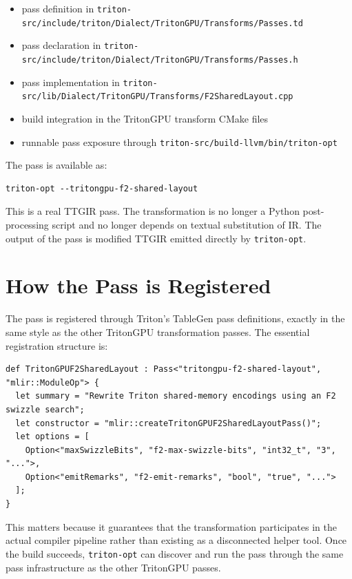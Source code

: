 \documentclass[11pt,a4paper]{article}
\begin{document}
\begin{itemize}
\item pass definition in
      \texttt{triton-src/include/triton/Dialect/TritonGPU/Transforms/Passes.td}
\item pass declaration in
      \texttt{triton-src/include/triton/Dialect/TritonGPU/Transforms/Passes.h}
\item pass implementation in
      \texttt{triton-src/lib/Dialect/TritonGPU/Transforms/F2SharedLayout.cpp}
\item build integration in the TritonGPU transform CMake files
\item runnable pass exposure through
      \texttt{triton-src/build-llvm/bin/triton-opt}
\end{itemize}

The pass is available as:

\begin{lstlisting}
triton-opt --tritongpu-f2-shared-layout
\end{lstlisting}

This is a real TTGIR pass.  The transformation is no longer a Python
post-processing script and no longer depends on textual substitution of IR.
The output of the pass is modified TTGIR emitted directly by
\texttt{triton-opt}.

\section{How the Pass is Registered}

The pass is registered through Triton's TableGen pass definitions, exactly in
the same style as the other TritonGPU transformation passes.  The essential
registration structure is:

\begin{lstlisting}[caption={Pass registration in TritonGPU \texttt{Passes.td}}]
def TritonGPUF2SharedLayout : Pass<"tritongpu-f2-shared-layout", "mlir::ModuleOp"> {
  let summary = "Rewrite Triton shared-memory encodings using an F2 swizzle search";
  let constructor = "mlir::createTritonGPUF2SharedLayoutPass()";
  let options = [
    Option<"maxSwizzleBits", "f2-max-swizzle-bits", "int32_t", "3", "...">,
    Option<"emitRemarks", "f2-emit-remarks", "bool", "true", "...">
  ];
}
\end{lstlisting}

This matters because it guarantees that the transformation participates in the
actual compiler pipeline rather than existing as a disconnected helper tool.
Once the build succeeds, \texttt{triton-opt} can discover and run the pass
through the same pass infrastructure as the other TritonGPU passes.
\end{document}
